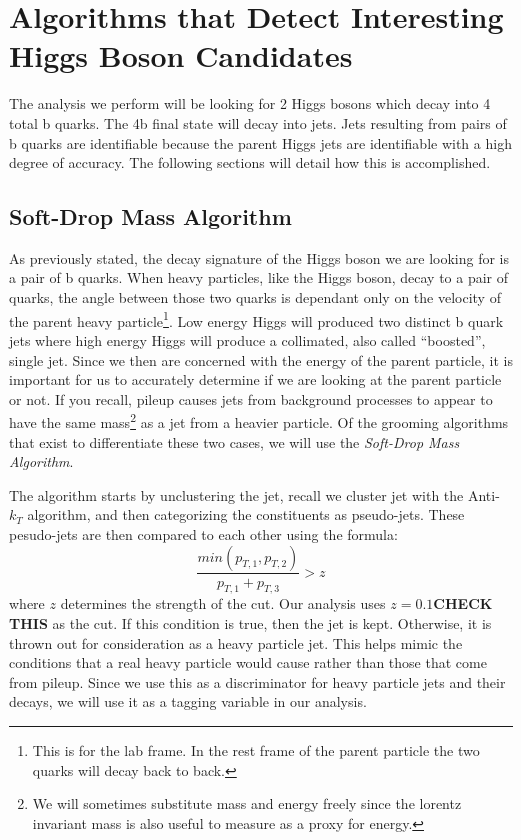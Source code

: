 \chapter{Algorithms that Detect Interesting Higgs Boson Candidates}
\label{chap:four}
The analysis we perform will be looking for 2 Higgs bosons which decay into 4 total b quarks.
The 4b final state will decay into jets. 
Jets resulting from pairs of b quarks are identifiable because the parent Higgs jets are identifiable with a high degree of accuracy.
The following sections will detail how this is accomplished.
\section{Soft-Drop Mass Algorithm}

As previously stated, the decay signature of the Higgs boson we are looking for is a pair of b quarks.
When heavy particles, like the Higgs boson, decay to a pair of quarks, the angle between those two quarks is dependant only on the velocity of the parent heavy particle\footnote{This is for the lab frame. In the rest frame of the parent particle the two quarks will decay back to back.}.
Low energy Higgs will produced two distinct b quark jets where high energy Higgs will produce a collimated, also called ``boosted'', single jet.
Since we then are concerned with the energy of the parent particle, it is important for us to accurately determine if we are looking at the parent particle or not.
If you recall, pileup causes jets from background processes to appear to have the same mass\footnote{We will sometimes substitute mass and energy freely since the lorentz invariant mass is also useful to measure as a proxy for energy.} as a jet from a heavier particle.
Of the grooming algorithms that exist to differentiate these two cases, we will use the \textit{Soft-Drop Mass Algorithm}.

The algorithm starts by unclustering the jet, recall we cluster jet with the Anti-$k_T$ algorithm, and then categorizing the constituents as pseudo-jets.
These pesudo-jets are then compared to each other using the formula:
\begin{equation}
    \frac{min(p_{T,1},p_{T,2})}{p_{T,1}+p_{T,3}} > z
\end{equation}
where $z$ determines the strength of the cut. Our analysis uses $z = 0.1$\textbf{CHECK THIS} as the cut. 
If this condition is true, then the jet is kept. Otherwise, it is thrown out for consideration as a heavy particle jet.
This helps mimic the conditions that a real heavy particle would cause rather than those that come from pileup.
Since we use this as a discriminator for heavy particle jets and their decays, we will use it as a tagging variable in our analysis.

